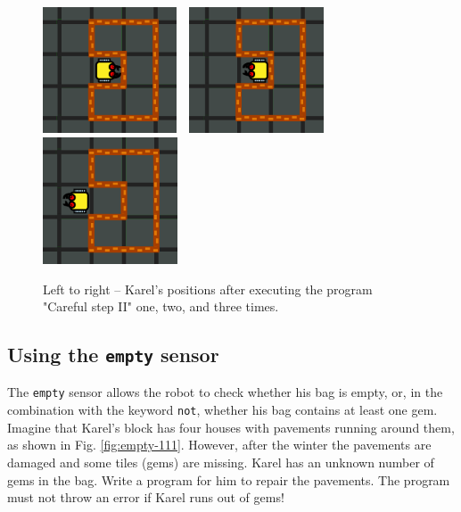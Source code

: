 \begin{figure}[!ht]
\begin{center}
\includegraphics[width=3.97cm]{img/if-112.png}\ \ 
\includegraphics[width=4cm]{img/if-113.png}\ \ 
\includegraphics[width=4cm]{img/if-115.png}
\vspace{-0mm}
\caption{Left to right -- Karel's positions after executing the program "Careful step II" 
         one, two, and three times.}
\label{fig:if-115}
\vspace{-12mm}
\end{center}
\end{figure}

\subsection{Using the {\tt empty} sensor}

The {\tt empty} sensor allows the robot to check whether his bag is empty,
or, in the combination with the keyword {\tt not}, whether his bag contains
at least one gem. Imagine that Karel's block has four houses with pavements 
running around them, as shown in Fig. \ref{fig:empty-111}. However, after
the winter the pavements are damaged and some tiles (gems) are missing. Karel 
has an unknown number of gems in the bag. Write a program for him to 
repair the pavements. The program must not throw an error if Karel 
runs out of gems!\\[-7mm]


